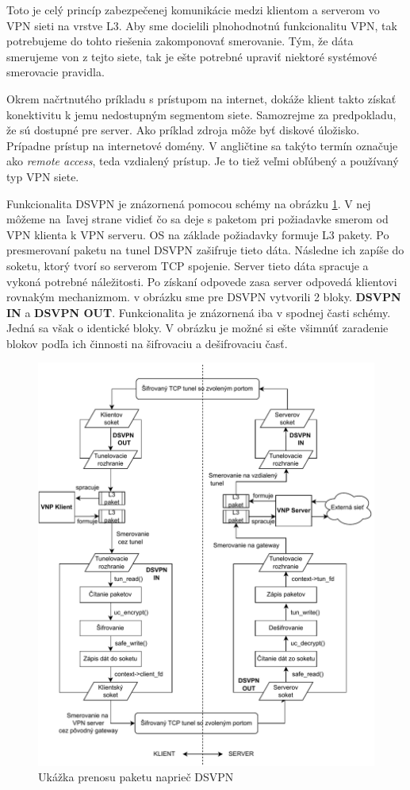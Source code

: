 Toto je celý princíp zabezpečenej komunikácie medzi klientom a serverom vo VPN sieti na vrstve L3. Aby sme docielili plnohodnotnú funkcionalitu VPN, tak potrebujeme do tohto riešenia zakomponovať smerovanie. Tým, že dáta smerujeme von z tejto siete, tak je ešte potrebné upraviť niektoré systémové smerovacie pravidla.      

Okrem načrtnutého príkladu s prístupom na internet, dokáže klient takto získať konektivitu k jemu nedostupným segmentom siete. Samozrejme za predpokladu, že sú dostupné pre server. Ako príklad zdroja môže byť diskové úložisko. Prípadne prístup na internetové domény. V angličtine sa takýto termín označuje ako \textit{remote access}, teda vzdialený prístup. Je to tiež veľmi obľúbený a používaný typ VPN siete. 

Funkcionalita DSVPN je znázornená pomocou schémy na obrázku \ref{dsvpnarch}. V nej môžeme na~ľavej strane vidieť čo sa deje s paketom pri požiadavke smerom od VPN klienta k VPN serveru. OS na základe požiadavky formuje L3 pakety. Po presmerovaní paketu na tunel DSVPN zašifruje tieto dáta. Následne ich zapíše do soketu, ktorý tvorí so serverom TCP spojenie. Server tieto dáta spracuje a vykoná potrebné náležitosti. Po získaní odpovede zasa server odpovedá klientovi rovnakým mechanizmom. v obrázku sme pre DSVPN vytvorili 2 bloky. \textbf{DSVPN IN} a \textbf{DSVPN OUT}. Funkcionalita je znázornená iba v spodnej časti schémy. Jedná sa však o identické bloky. V obrázku je možné si ešte všimnúť zaradenie blokov podľa ich činnosti na šifrovaciu a dešifrovaciu časť. 
\begin{figure}[h!]
	\centering
	\includegraphics[width=1.1\textwidth]{figures/dsvpn.pdf}
	\caption{Ukážka prenosu paketu naprieč DSVPN}
	\label{dsvpnarch}
\end{figure}


